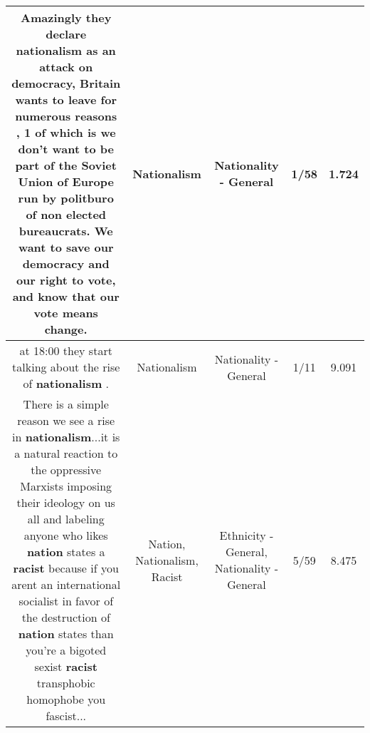 \documentclass[11pt]{article}
\newlength\mylength
\begin{document}
\begin{center}
\begin{longtable}{|C{.65\mylength}|C{.30\mylength}|C{.12\mylength}|C{.12\mylength}|C{.12\mylength}|}
  \small Amazingly they declare \textbf{nationalism} as an attack on democracy, Britain wants to leave for numerous reasons , 1 of which is we don't want to be part of the Soviet Union of Europe run by politburo of non elected bureaucrats. We want to save our democracy and our right to vote, and know that our vote means change.\normalsize   & Nationalism & Nationality - General & 1/58 & 1.724 \\  \hline
  \small at 18:00 they start talking about the rise of \textbf{nationalism} .\normalsize   & Nationalism & Nationality - General & 1/11 & 9.091 \\  \hline
  \small There is a simple reason we see a rise in \textbf{nationalism}...it is a natural reaction to the oppressive Marxists imposing their ideology on us all and labeling anyone who likes \textbf{nation} states a \textbf{racist} because if you arent an international socialist in favor of the destruction of \textbf{nation} states than you're a bigoted sexist \textbf{racist} transphobic homophobe you fascist...\normalsize   & Nation, Nationalism, Racist & Ethnicity - General, Nationality - General & 5/59 & 8.475 \\  \hline

\end{longtable}
\end{center}
\end{document}
